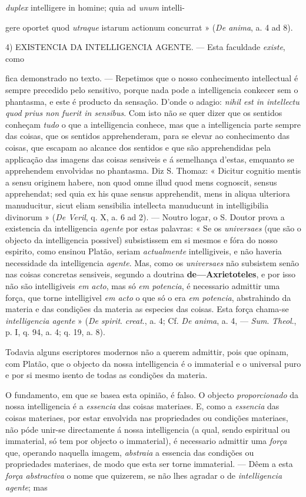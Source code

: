 \emph{duplex} intelligere in homine; quia ad \emph{unum} intelli-\par gere oportet quod \emph{utraque} istarum actionum concurrat » (\emph{De anima}, a. 4 ad 8).\par 4) \textsc{EXISTENCIA} DA INTELLIGENCIA AGENTE. --- Esta faculdade \emph{existe}, como\par fica demonstrado no texto. --- Repetimos que o nosso conhecimento intellectual é sempre precedido pelo sensitivo, porque nada pode a intelligencia conkecer sem o phantasma, e este é producto da sensação. D'onde o adagio: \emph{nihil est in intellectu quod prius non fuerit in sensibus}. Com isto não se quer dizer que os sentidos conheçam \emph{tudo} o que a intelligencia conhece, mas que a intelligencia parte sempre das coisas, que os sentidos apprehenderam, para se elevar ao conhecimento das coisas, que escapam ao alcance dos sentidos e que são apprehendidas pela applicação das imagens das coisas sensiveis e á semelhança d'estas, emquanto se apprehendem envolvidas no phantasma. Diz S. Thomaz: « Dicitur cognitio mentis a sensu originem habere, non quod omne illud quod mens cognoscit, sensus apprehendat; sed quia ex his quae sensus apprehendit, mens in aliqua ulteriora manuducitur, sicut eliam sensibilia intellecta manuducunt in intelligibilia divinorum » (\emph{De Veril}, q. X, a. 6 ad 2). --- Noutro logar, o S. Doutor prova a existencia da intelligencia \emph{agente} por estas palavras: « Se os \emph{universaes} (que são o objecto da intelligencia possivel) subsistissem em si mesmos e fóra do nosso espirito, como ensinou Platão, seriam \emph{actualmente} intelligiveis, e não haveria necessidade da intelligencia \emph{agente}. Mas, como os \emph{universaes} não subsistem senão nas coisas concretas sensiveis, segundo a doutrina \textbf{de---Axrietoteles}, e por isso não são intelligiveis \emph{em acto}, mas só \emph{em potencia}, é necessario admittir uma força, que torne intelligivel \emph{em acto} o que só o era \emph{em potencia}, abstrahindo da materia e das condições da materia as especies das coisas. Esta força chama-se \emph{intelligencia agente} » (\emph{De spirit}. \emph{creat}., a. 4; Cf. \emph{De anima}, a. 4, --- \emph{Sum}. \emph{Theol}., p. I, q. 94, a. 4; q. 19, a. 8).\par Todavia alguns escriptores modernos não a querem admittir, pois que opinam, com Platão, que o objecto da nossa intelligencia é o immaterial e o universal puro e por si mesmo isento de todas as condições da materia.\par O fundamento, em que se basea esta opinião, é falso. O objecto \emph{proporcionado} da nossa intelligencia é a \emph{essencia} das coisas materiaes. E, como a \emph{essencia} das coisas materiaes, por estar envolvida nas propriedades ou condições materiaes, não póde unir-se directamente á nossa intelligencia (a qual, sendo espiritual ou immaterial, só tem por objecto o immaterial), é necessario admittir uma \emph{força} que, operando naquella imagem, \emph{abstraia} a essencia das condições ou propriedades materiaes, de modo que esta ser torne immaterial. --- Dêem a esta \emph{força abstractiva} o nome que quizerem, se não lhes agradar o de \emph{intelligencia agente}; mas 